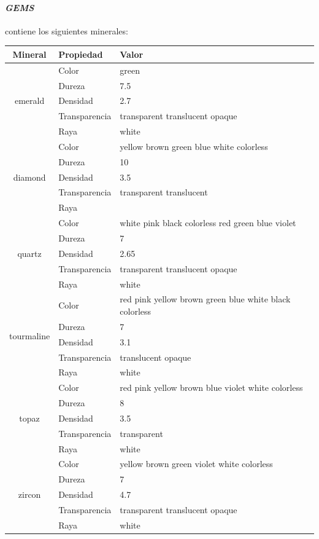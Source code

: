 \documentclass[a4paper,10pt]{article}
\begin{document}
\paragraph{\textit{GEMS}} contiene los siguientes minerales:
\hspace{-1.2cm}
\begin{tabular}{|c|l|l|}
    \hline
    Mineral & Propiedad & Valor \\ \hline
    \multirow{5}{*}{emerald} 
        & Color &  green \\
        & Dureza &  7.5 \\
        & Densidad &  2.7 \\
        & Transparencia & transparent translucent opaque\\
        & Raya &  white\\\hline
    \multirow{5}{*}{diamond} 
        & Color &  yellow brown green blue white colorless \\
        & Dureza &  10 \\
        & Densidad &  3.5 \\
        & Transparencia &  transparent translucent \\
        & Raya &  \\\hline
    \multirow{5}{*}{quartz} 
        & Color & white pink black colorless red green blue violet \\
        & Dureza & 7 \\
        & Densidad & 2.65 \\
        & Transparencia & transparent translucent opaque \\
        & Raya & white \\ \hline
    \multirow{5}{*}{tourmaline} 
        & Color & red pink yellow brown green blue white black colorless \\
        & Dureza & 7 \\
        & Densidad & 3.1 \\
        & Transparencia & translucent opaque \\
        & Raya & white \\ \hline
    \multirow{5}{*}{topaz} 
        & Color & red pink yellow brown blue violet white colorless \\
        & Dureza & 8 \\
        & Densidad & 3.5 \\
        & Transparencia & transparent \\
        & Raya & white \\ \hline
    \multirow{5}{*}{zircon} 
        & Color & yellow brown green violet white colorless \\
        & Dureza & 7 \\
        & Densidad & 4.7 \\
        & Transparencia & transparent translucent opaque \\
        & Raya & white \\ \hline
    
\end{tabular}
        
\end{document}
